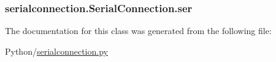 \subsubsection[{\texorpdfstring{ser}{ser}}]{\setlength{\rightskip}{0pt plus 5cm}serialconnection.\+Serial\+Connection.\+ser}\hypertarget{classserialconnection_1_1SerialConnection_a5b2f2670cc97ed8970dadd829f623d66}{}\label{classserialconnection_1_1SerialConnection_a5b2f2670cc97ed8970dadd829f623d66}


The documentation for this class was generated from the following file\+:\begin{DoxyCompactItemize}
\item 
Python/\hyperlink{serialconnection_8py}{serialconnection.\+py}\end{DoxyCompactItemize}
